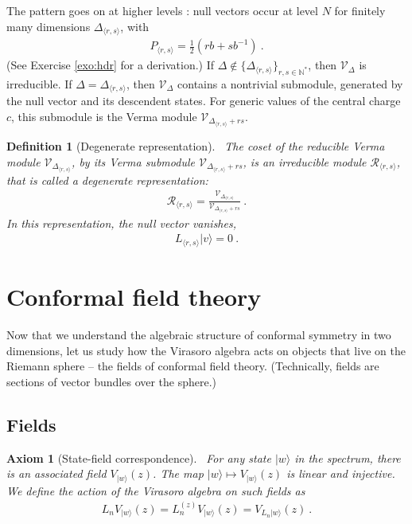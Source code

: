 \documentclass[12pt, a4paper]{article}
\theoremstyle{break}
\newtheorem{hyp}[exo]{Axiom}
\newtheorem{defn}[exo]{Definition}
\begin{document}
The pattern goes on at higher levels \cite{fms97}: null vectors occur at level $N$ for finitely many dimensions $\Delta_{\langle r,s\rangle}$, with
\begin{align}
  P_{\langle r,s\rangle} = \frac12(rb+sb^{-1})\ .
  \label{eq:ars}
 \end{align}
 (See Exercise \ref{exo:hdr} for a derivation.)
If $\Delta\notin\{\Delta_{\langle r,s\rangle}\}_{r,s\in\mathbb{N}^*}$, then $\mathcal V_\Delta$ is irreducible. If $\Delta = \Delta_{\langle r,s\rangle}$, then $\mathcal V_\Delta$ contains a nontrivial submodule, generated by the null vector and its descendent states. For generic values of the central charge $c$, this submodule is the Verma module $\mathcal V_{\Delta_{\langle r,s\rangle}+rs}$.

\begin{defn}[Degenerate representation]
 ~\label{def:deg}
The coset of the reducible Verma module $\mathcal V_{\Delta_{\langle r,s\rangle}}$, by its Verma submodule $\mathcal V_{\Delta_{\langle r,s\rangle}+rs}$, is an irreducible module $\mathcal{R}_{\langle r,s\rangle}$, that is called a degenerate representation:
\begin{align}
 \mathcal{R}_{\langle r,s\rangle} = \frac{\mathcal V_{\Delta_{\langle r,s\rangle}}}{\mathcal V_{\Delta_{\langle r,s\rangle}+rs}}\ .
\end{align}
In this representation, the null vector vanishes,
\begin{align}
 L_{\langle r,s\rangle}|v\rangle = 0\ .
\end{align}
\end{defn}


\section{Conformal field theory}\label{sec:cft}

Now that we understand the algebraic structure of conformal symmetry in two dimensions, let us study how the Virasoro algebra acts on objects that live on the Riemann sphere -- the fields of conformal field theory. (Technically, fields are sections of vector bundles over the sphere.)

\subsection{Fields}

\begin{hyp}[State-field correspondence]
 ~\label{hyp:sfc}
For any state $|w\rangle$ in the spectrum, there is an associated field $V_{|w\rangle}(z)$. The map $|w\rangle \mapsto V_{|w\rangle}(z)$ is linear and injective. We define the action of the Virasoro algebra on such fields as 
\begin{align}
 L_n V_{|w\rangle}(z) =  L_n^{(z)} V_{|w\rangle}(z) = V_{L_n|w\rangle}(z)\ .
\end{align}
\end{hyp}
\end{document}
